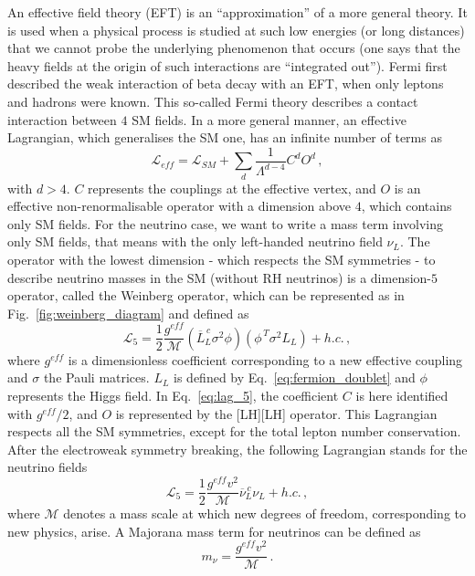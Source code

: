An effective field theory (EFT) is an ``approximation'' of a more general theory.
It is used when a physical process is studied at such low energies (or long distances) that we cannot probe the underlying phenomenon that occurs (one says that the heavy fields at the origin of such
interactions are ``integrated out'').
Fermi first described the weak interaction of beta decay with an EFT, when only leptons and hadrons were known.
This so-called Fermi theory describes a contact interaction between $4$ SM fields.
In a more general manner, an effective Lagrangian, which generalises the SM one, has an infinite number of terms as
\begin{equation}
  \mathcal{L}_{eff}=\mathcal{L}_{SM}+\sum_{d}\frac{1}{\Lambda^{d-4}}C^{d}O^{d}\,,
\end{equation}
with $d>4$.
$C$ represents the couplings at the effective vertex, and $O$ is an effective non-renormalisable operator with a dimension above $4$, which contains only SM fields.
For the neutrino case, we want to write a mass term involving only SM fields, that means with the only left-handed neutrino field $\nu_L$.
The operator with the lowest dimension - which respects the SM symmetries - to describe neutrino masses in the SM (without RH neutrinos) is a dimension-$5$ operator, called the Weinberg operator, which can be represented as in Fig.~\ref{fig:weinberg_diagram} and defined as
\begin{equation}
  \mathcal{L}_5 = \frac{1}{2}\frac{g^{eff}}{\mathcal{M}}(\overline{L}_{L}^{\,c}\sigma^{2}\phi)(\phi^{\,T}\sigma^{2}L_L)+h.c.\,,
  \label{eq:lag_5}
\end{equation}
where $g^{eff}$ is a dimensionless coefficient corresponding to a new effective coupling and $\sigma$ the Pauli matrices.
$L_L$ is defined by Eq.~\eqref{eq:fermion_doublet} and $\phi$ represents the Higgs field.
In Eq.~\eqref{eq:lag_5}, the coefficient $C$ is here identified with $g^{eff}/2$, and $O$ is represented by the [LH][LH] operator.
This Lagrangian respects all the SM symmetries, except for the total lepton number conservation.
After the electroweak symmetry breaking, the following Lagrangian stands for the neutrino fields
\begin{equation}
  \mathcal{L}_5=\frac{1}{2}\frac{g^{eff}v^{2}}{\mathcal{M}}\overline{\nu}^{\,c}_{L}\nu_{L}+h.c.\,,
\end{equation}
where $\mathcal{M}$ denotes a mass scale at which new degrees of freedom, corresponding to new physics, arise.
A Majorana mass term for neutrinos can be defined as
\begin{equation}
m_{\nu}=\frac{g^{eff}v^{2}}{\mathcal{M}}\,.
\label{eq:mass_maj}
\end{equation}
